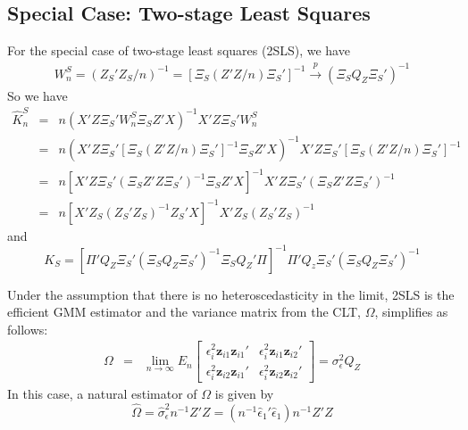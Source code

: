 \documentclass[12pt]{article}
\theoremstyle{definition}
\begin{document}
\subsection{Special Case: Two-stage Least Squares}
For the special case of two-stage least squares (2SLS), we have
  \begin{eqnarray*}
     W_n^S = (Z_S' Z_S/n)^{-1} = \left[\Xi_S (Z'Z/n) \Xi_S'\right]^{-1}  \overset{p}{\rightarrow} \left(\Xi_S Q_Z \Xi_S'\right)^{-1}
   \end{eqnarray*} 
So we have
  \begin{eqnarray*}
    \widehat{K}_n^S &=& n\left(X'Z \Xi_S' W^S_n \Xi_S Z' X\right)^{-1}X' Z \Xi_S' W^S_n \\
        &=& n\left(X'Z \Xi_S' \left[\Xi_S (Z'Z/n) \Xi_S'\right]^{-1}  \Xi_S Z' X\right)^{-1}X' Z \Xi_S' \left[\Xi_S (Z'Z/n) \Xi_S'\right]^{-1} \\
        &=& n\left[X'Z \Xi_S' \left(\Xi_S Z'Z \Xi_S'\right)^{-1}  \Xi_S Z' X\right]^{-1}X' Z \Xi_S' \left(\Xi_S Z'Z \Xi_S'\right)^{-1}\\
        &=& n\left[X' Z_S (Z_S' Z_S)^{-1} Z_S' X\right]^{-1} X'Z_S (Z_S' Z_S)^{-1}
  \end{eqnarray*}
and
    \begin{equation}
      K_S =  \left[\Pi' Q_Z \Xi_S' \left(\Xi_S Q_Z \Xi_S'\right)^{-1} \Xi_S Q_Z' \Pi\right]^{-1} \Pi'Q_z \Xi_S'\left(\Xi_S Q_Z \Xi_S'\right)^{-1}
    \end{equation}    



Under the assumption that there is no heteroscedasticity in the limit, 2SLS is the efficient GMM estimator and the variance matrix from the CLT, $\Omega$, simplifies as follows:
\begin{eqnarray*}
\Omega &=& \lim_{n\rightarrow \infty}E_n \left[\begin{array}
           {cc} 
           \epsilon_i^2 \mathbf{z}_{i1}\mathbf{z}_{i1}' & \epsilon_i^2 \mathbf{z}_{i1}\mathbf{z}_{i2}'\\
           \epsilon_i^2 \mathbf{z}_{i2}\mathbf{z}_{i1}' & \epsilon_i^2 \mathbf{z}_{i2}\mathbf{z}_{i2}'
          \end{array}\right]  = \sigma_\epsilon^2 Q_Z
\end{eqnarray*}
In this case, a natural estimator of $\Omega$ is given by
  $$\widehat{\Omega} = \widehat{\sigma}_\epsilon^2 n^{-1}Z'Z = \left(n^{-1}\hat{\epsilon}_1 ' \hat{\epsilon}_1\right) n^{-1}Z'Z$$
\end{document}
